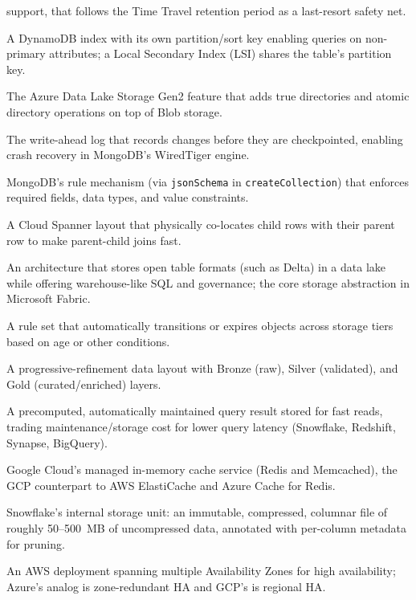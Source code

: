 \begin{description}
    support, that follows the Time Travel retention period as a last-resort safety net.
  \item[Global Secondary Index (GSI)] A DynamoDB index with its own partition/sort key enabling
    queries on non-primary attributes; a Local Secondary Index (LSI) shares the table's partition key.
  \item[Hierarchical namespace (HNS)] The Azure Data Lake Storage Gen2 feature that adds true
    directories and atomic directory operations on top of Blob storage.
  \item[Journal (WAL)] The write-ahead log that records changes before they are checkpointed, enabling
    crash recovery in MongoDB's WiredTiger engine.
  \item[JSON Schema validation] MongoDB's rule mechanism (via \texttt{jsonSchema} in
    \texttt{createCollection}) that enforces required fields, data types, and value constraints.
  \item[Interleaved table] A Cloud Spanner layout that physically co-locates child rows with their
    parent row to make parent-child joins fast.
  \item[Lakehouse] An architecture that stores open table formats (such as Delta) in a data lake while
    offering warehouse-like SQL and governance; the core storage abstraction in Microsoft Fabric.
  \item[Lifecycle policy] A rule set that automatically transitions or expires objects across storage
    tiers based on age or other conditions.
  \item[Medallion architecture] A progressive-refinement data layout with Bronze (raw), Silver
    (validated), and Gold (curated/enriched) layers.
  \item[Materialized view] A precomputed, automatically maintained query result stored for fast reads,
    trading maintenance/storage cost for lower query latency (Snowflake, Redshift, Synapse, BigQuery).
  \item[Memorystore] Google Cloud's managed in-memory cache service (Redis and Memcached), the GCP
    counterpart to AWS ElastiCache and Azure Cache for Redis.
  \item[Micro-partition] Snowflake's internal storage unit: an immutable, compressed, columnar file of
    roughly 50--500~MB of uncompressed data, annotated with per-column metadata for pruning.
  \item[Multi-AZ] An AWS deployment spanning multiple Availability Zones for high availability; Azure's
    analog is zone-redundant HA and GCP's is regional HA.

\end{description}
